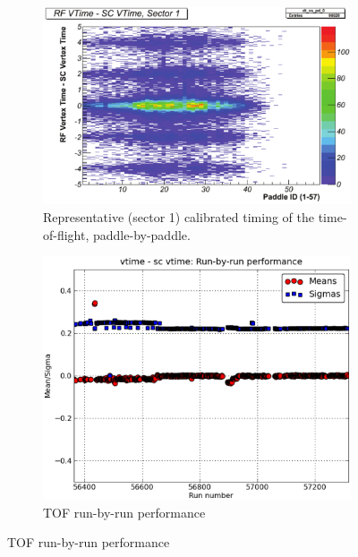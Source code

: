 \begin{figure}\begin{center}
    \begin{subfigure}{0.5\columnwidth}\begin{center}
        \includegraphics[width=.9\linewidth]{figures/calib/tof/Tof_56855_final_s1p2p.pdf}
        \caption{Representative (sector 1) calibrated timing of the time-of-flight, paddle-by-paddle.}
        \label{plt:tofsec1}
    \end{center}\end{subfigure}\begin{subfigure}{0.5\columnwidth}\begin{center}
        \includegraphics[width=.9\linewidth]{figures/calib/tof/Tof_runscan_p0v7.eps}
        \caption{TOF run-by-run performance}
        \label{plt:tofrunbyrun}
    \end{center}\end{subfigure}
\end{center}\end{figure}

